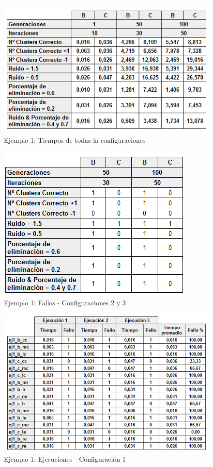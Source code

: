 \documentclass[conference,a4paper]{IEEEtran}
\begin{document}
\begin{figure}[H]
\centering
\includegraphics[scale=0.6]{Experimentacion/Ejemplo1/Ejemplo1Completo}
\caption{Ejemplo 1: Tiempos de todas la configuraciones\\}
\end{figure}

\begin{figure}[H]
\centering
\includegraphics[scale=0.7]{Experimentacion/Ejemplo1/Ejemplo1Fallos}
\caption{Ejemplo 1: Fallos - Configuraciones 2 y 3\\}
\end{figure}

\begin{figure}[H]
\centering
\includegraphics[scale=0.5]{Experimentacion/Ejemplo1/Ejemplo1Ejecuciones}
\caption{Ejemplo 1: Ejecuciones - Configuración 1\\}
\end{figure}
\end{document}
